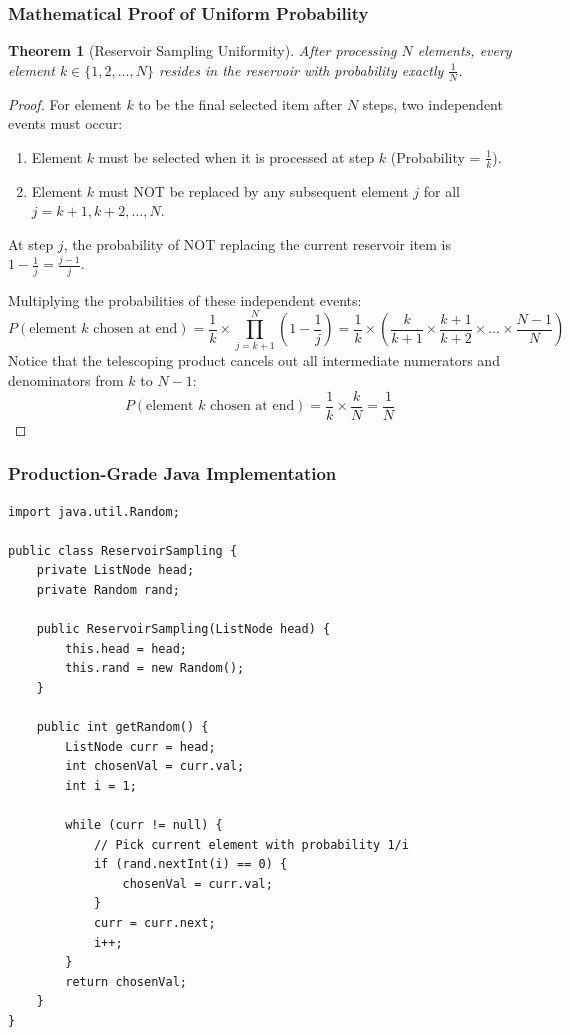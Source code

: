 \documentclass[10pt,journal,compsoc,onecolumn]{IEEEtran}
\newtheorem{theorem}{Theorem}
\begin{document}
\subsubsection{Mathematical Proof of Uniform Probability}

\begin{theorem}[Reservoir Sampling Uniformity]
After processing $N$ elements, every element $k \in \{1, 2, \dots, N\}$ resides in the reservoir with probability exactly $\frac{1}{N}$.
\end{theorem}

\begin{proof}
For element $k$ to be the final selected item after $N$ steps, two independent events must occur:
\begin{enumerate}
    \item Element $k$ must be selected when it is processed at step $k$ (Probability = $\frac{1}{k}$).
    \item Element $k$ must NOT be replaced by any subsequent element $j$ for all $j = k+1, k+2, \dots, N$.
\end{enumerate}
At step $j$, the probability of NOT replacing the current reservoir item is $1 - \frac{1}{j} = \frac{j-1}{j}$.

Multiplying the probabilities of these independent events:
\[
P(\text{element } k \text{ chosen at end}) = \frac{1}{k} \times \prod_{j=k+1}^{N} \left( 1 - \frac{1}{j} \right) = \frac{1}{k} \times \left( \frac{k}{k+1} \times \frac{k+1}{k+2} \times \dots \times \frac{N-1}{N} \right)
\]
Notice that the telescoping product cancels out all intermediate numerators and denominators from $k$ to $N-1$:
\[
P(\text{element } k \text{ chosen at end}) = \frac{1}{k} \times \frac{k}{N} = \frac{1}{N}
\]
\end{proof}

\subsubsection{Production-Grade Java Implementation}

\begin{verbatim}
import java.util.Random;

public class ReservoirSampling {
    private ListNode head;
    private Random rand;

    public ReservoirSampling(ListNode head) {
        this.head = head;
        this.rand = new Random();
    }

    public int getRandom() {
        ListNode curr = head;
        int chosenVal = curr.val;
        int i = 1;

        while (curr != null) {
            // Pick current element with probability 1/i
            if (rand.nextInt(i) == 0) {
                chosenVal = curr.val;
            }
            curr = curr.next;
            i++;
        }
        return chosenVal;
    }
}
\end{verbatim}
\end{document}
